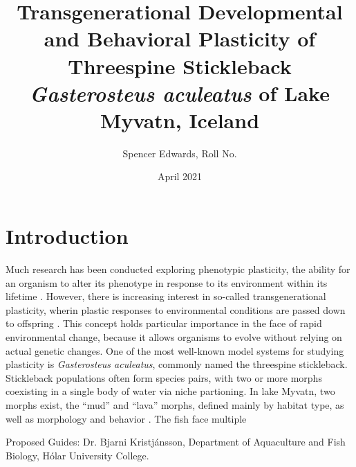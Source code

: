 \documentclass[12pt]{extarticle}
\title{Transgenerational Developmental and Behavioral Plasticity of Threespine Stickleback \textit{Gasterosteus aculeatus} of Lake Myvatn, Iceland}
\author{Spencer Edwards, Roll No.}
\date{April 2021}
\begin{document}
\maketitle

\section*{Introduction}
Much research has been conducted exploring phenotypic plasticity, the ability for an organism to alter its phenotype in response to its environment within its lifetime \citep{Denver2010, Kishida2010, Klemetsen2010}. However, there is increasing interest in so-called transgenerational plasticity, wherin plastic responses to environmental conditions are passed down to offspring \citep{Hellmann2020, Richter-Boix2014, Bell2019, Shama2014}. This concept holds particular importance in the face of rapid environmental change, because it allows organisms to evolve without relying on actual genetic changes. One of the most well-known model systems for studying plasticity is \textit{Gasterosteus aculeatus}, commonly named the threespine stickleback. Stickleback populations often form species pairs, with two or more morphs coexisting in a single body of water via niche partioning. In lake Myvatn, two morphs exist, the ``mud'' and ``lava'' morphs, defined mainly by habitat type, as well as morphology and behavior \citep{Kristjansson2002, Millet2013}. The fish face multiple  

Proposed Guides: Dr. Bjarni Kristj\'ansson, Department of Aquaculture and Fish Biology, H\'olar University College.

\end{document}
